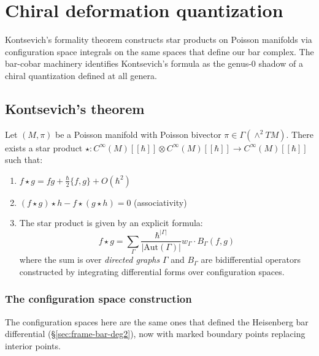 \chapter{Chiral deformation quantization}
\label{ch:chiral-deformation}
\label{chap:chiral-deformation}


Kontsevich's formality theorem constructs star products on Poisson manifolds via configuration space integrals on the same spaces that define our bar complex.  The bar-cobar machinery identifies Kontsevich's formula as the genus-$0$ shadow of a chiral quantization defined at all genera.

\section{Kontsevich's theorem}

\begin{theorem}
\label{thm:kontsevich-star-product}
Let $(M, \pi)$ be a Poisson manifold with Poisson bivector $\pi \in \Gamma(\wedge^2 TM)$. There exists a star product $\star: C^\infty(M)[[\hbar]] \otimes C^\infty(M)[[\hbar]] \to C^\infty(M)[[\hbar]]$ such that:
\begin{enumerate}
\item $f \star g = fg + \frac{\hbar}{2}\{f,g\} + O(\hbar^2)$
\item $(f \star g) \star h - f \star (g \star h) = 0$ (associativity)
\item The star product is given by an explicit formula:
\[f \star g = \sum_{\Gamma} \frac{\hbar^{|\Gamma|}}{|\text{Aut}(\Gamma)|} w_\Gamma \cdot B_\Gamma(f,g)\]
where the sum is over \emph{directed graphs} $\Gamma$ and $B_\Gamma$ are bidifferential operators constructed by integrating differential forms over configuration spaces.
\end{enumerate}
\end{theorem}

\subsection{The configuration space construction}

The configuration spaces here are the same ones that defined the Heisenberg bar differential (\S\ref{sec:frame-bar-deg2}), now with marked boundary points replacing interior points.

